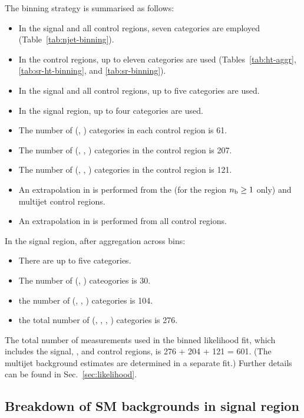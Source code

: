 The binning strategy is summarised as follows: 
\begin{itemize}
\item In the signal and all control regions, seven \njet categories
  are employed (Table~\ref{tab:njet-binning}). 
\item In the control regions, up to eleven \scalht categories are
  used (Tables~\ref{tab:ht-aggr}, \ref{tab:sr-ht-binning}, and
  \ref{tab:sr-binning}).  
\item In the signal and all control regions, up to five \nb categories
  are used.
\item In the signal region, up to four \HTmiss categories are used.
\item The number of (\njet, \scalht) categories in each control region
  is 61.
\item The number of (\njet, \scalht, \nb) categories in the \mj
  control region is 207.
\item The number of (\njet, \scalht, \nb) categories in the \mmj
  control region is 121.
\item An extrapolation in \nb is performed from the \mmj (for the
  region $n_{\text{b}} \geq 1$ only) and multijet control regions.
\item An extrapolation in \HTmiss is performed from all control regions.
\end{itemize}
In the signal region, after aggregation across \scalht bins: 
\begin{itemize}
\item There are up to five \scalht categories.
\item The number of (\njet, \scalht) cateogories is 30.
\item the number of (\njet, \scalht, \nb) categories is 104.
\item the total number of (\njet, \scalht, \nb, \HTmiss) categories is
  276. 
\end{itemize}

The total number of measurements used in the binned likelihood fit,
which includes the signal, \mj, and \mmj control regions, is 276 + 204
+ 121 = 601. (The multijet background estimates are determined in a
separate fit.) Further details can be found in
Sec.~\ref{sec:likelihood}.

\subsection{Breakdown of SM backgrounds in signal region}%
\label{sec:smbreakdown}

